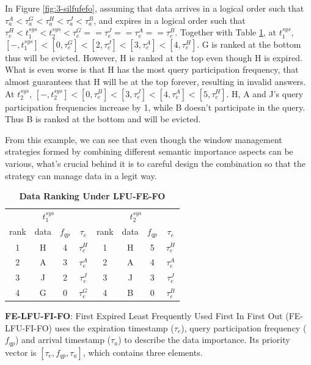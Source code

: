 In Figure \ref{fig:3-silfufefo}, assuming that data arrives in a logical order such that $\tau^{A}_{a} < \tau^{G}_{a} < \tau^{H}_{a} < \tau^{J}_{a} < \tau^{B}_{a}$, and expires in a logical order such that $\tau^{H}_{e} < t^{sys}_{1} < t^{sys}_{2} < \tau^{G}_{e} == \tau^{J}_{e} == \tau^{A}_{e} == \tau^{B}_{e}$. 
Together with Table \ref{tab:lfufefo}, at $t^{sys}_{1}$, $[-, t^{sys}_{1}] < [0, \tau^{G}_{e}] < [2, \tau^{J}_{e}] < [3, \tau^{A}_{e}] < [4, \tau^{H}_{e}]$. 
G is ranked at the bottom thus will be evicted.
However, H is ranked at the top even though H is expired. 
What is even worse is that H has the most query participation frequency, that almost guarantees that H will be at the top forever, resulting in invalid answers.
At $t^{sys}_{2}$, $[-, t^{sys}_{2}] < [0, \tau^{B}_{e}] < [3, \tau^{J}_{e}] < [4, \tau^{A}_{e}] < [5, \tau^{H}_{e}]$.
H, A and J's query participation frequencies increase by 1, while B doesn't participate in the query.
Thus B is ranked at the bottom and will be evicted. 

From this example, we can see that even though the window management strategies formed by combining different semantic importance aspects can be various, what's crucial behind it is to careful design the combination so that the strategy can manage data in a legit way. 

\begin{table}[!htbp]
\centering
\caption{\textbf{Data Ranking Under LFU-FE-FO}}
\label{tab:lfufefo}
\begin{tabular}{|c|c|c|c||c|c|c|c|}
\hline
\multicolumn{4}{|c||}{$t^{sys}_{1}$} & \multicolumn{4}{c|}{$t^{sys}_{2}$} \\ \hhline{|====#====|}
rank & data & $f_{qp}$ & $\tau_{e}$ & rank & data & $f_{qp}$ & $\tau_{e}$ \\ \hhline{|=|=|=|=#=|=|=|=|}
1 & H & 4 & $\tau^{H}_{e}$ & 1 & H & 5 & $\tau^{H}_{e}$ \\ \hline
2 & A & 3 & $\tau^{A}_{e}$ & 2 & A & 4 & $\tau^{A}_{e}$ \\ \hline
3 & J & 2 & $\tau^{J}_{e}$ & 3 & J & 3 & $\tau^{J}_{e}$ \\ \hline
4 & G & 0 & $\tau^{G}_{e}$ & 4 & B & 0 & $\tau^{B}_{e}$ \\ \hline
\end{tabular}
\end{table}

\textbf{FE-LFU-FI-FO}:
First Expired Least Frequently Used First In First Out (FE-LFU-FI-FO) uses the expiration timestamp ($\tau_{e}$), query participation frequency ($f_{qp}$) and arrival timestamp ($\tau_{a}$) to describe the data importance.
Its priority vector is $[\tau_{e}, f_{qp}, \tau_{a}]$, which contains three elements.

